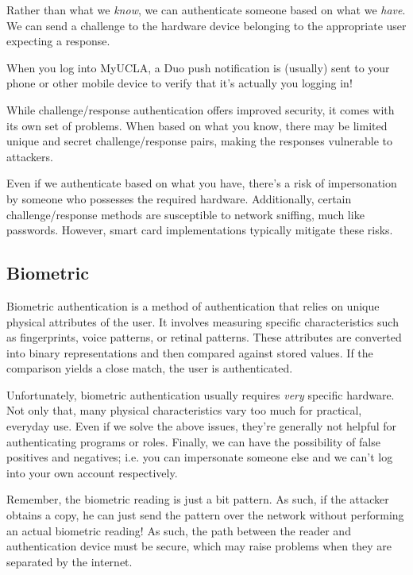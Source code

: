 \documentclass{report}
\newcommand{\exampleBegin}[1]{\begin{tcolorbox}[colback=blue!5!white,colframe=black!75!blue,title={Example:
      #1}]}
\newcommand{\exampleEnd}{\end{tcolorbox}}
\newcommand{\corollaryBegin}[1]{\begin{tcolorbox}[colback=teal!5!white,colframe=black!75!teal,title={Corollary:
      #1}]}
\newcommand{\corollaryEnd}{\end{tcolorbox}}
\begin{document}
\corollaryBegin{Hardware-based Challenge/Response}
Rather than what we \textit{know}, we can authenticate someone based on what we \textit{have}. We
can send a challenge to the hardware device belonging to the appropriate user expecting a response.

\exampleBegin{Duo Push}
When you log into MyUCLA, a Duo push notification is (usually) sent to your phone or other mobile
device to verify that it's actually you logging in!
\exampleEnd
\corollaryEnd

While challenge/response authentication offers improved security, it comes with its own set of
problems. When based on what you know, there may be limited unique and secret challenge/response
pairs, making the responses vulnerable to attackers.

Even if we authenticate based on what you have, there's a risk of impersonation by someone who
possesses the required hardware. Additionally, certain challenge/response methods are susceptible to
network sniffing, much like passwords. However, smart card implementations typically mitigate these
risks.


\subsection{Biometric}
Biometric authentication is a method of authentication that relies on unique physical attributes of
the user. It involves measuring specific characteristics such as fingerprints, voice patterns, or
retinal patterns. These attributes are converted into binary representations and then compared
against stored values. If the comparison yields a close match, the user is authenticated. 

Unfortunately, biometric authentication usually requires \textit{very} specific hardware. Not only
that, many physical characteristics vary too much for practical, everyday use. Even if we solve the
above issues, they're generally not helpful for authenticating programs or roles. Finally, we can
have the possibility of false positives and negatives; i.e. you can impersonate someone else and we
can't log into your own account respectively.


\corollaryBegin{Remote Authentication}
Remember, the biometric reading is just a bit pattern. As such, if the attacker obtains a copy, he
can just send the pattern over the network without performing an actual biometric reading! As such,
the path between the reader and authentication device must be secure, which may raise problems when
they are separated by the internet.
\corollaryEnd
\end{document}
